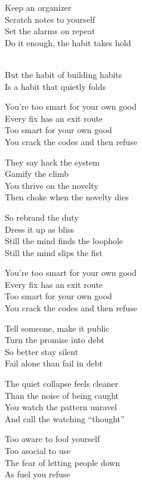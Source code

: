 \begin{lyrics}
Keep an organizer\\
Scratch notes to yourself\\
Set the alarms on repeat\\
Do it enough, the habit takes hold

\\
But the habit of building habits\\
Is a habit that quietly folds

You’re too smart for your own good\\
Every fix has an exit route\\
Too smart for your own good\\
You crack the codes and then refuse

They say hack the system\\
Gamify the climb\\
You thrive on the novelty\\
Then choke when the novelty dies

So rebrand the duty\\
Dress it up as bliss\\
Still the mind finds the loophole\\
Still the mind slips the fist

You’re too smart for your own good\\
Every fix has an exit route\\
Too smart for your own good\\
You crack the codes and then refuse

Tell someone, make it public\\
Turn the promise into debt\\
So better stay silent\\
Fail alone than fail in debt

The quiet collapse feels cleaner\\
Than the noise of being caught\\
You watch the pattern unravel\\
And call the watching “thought”

Too aware to fool yourself\\
Too asocial to use\\
The fear of letting people down\\
As fuel you refuse


\end{lyrics}
